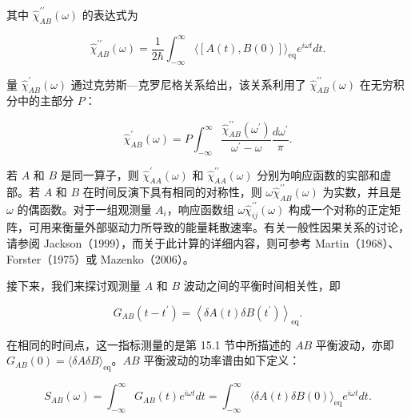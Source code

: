 其中 \(\hat{\chi}_{AB}^{\prime\prime}(\omega)\) 的表达式为

\begin{equation}\tag{15.6.12}\label{eq:15.6.12}
\hat { \chi } _ { A B } ^{\prime \prime} ( \omega ) = \frac { 1 } { 2 \hbar } \int _ { - \infty } ^{\infty} \langle [ A ( t ) , B ( 0 ) ] \rangle _ { \mathrm { e q } } e ^{i \omega t} d t .
\end{equation}

量 \(\hat{\chi}_{AB}^{\prime}(\omega)\) 通过克劳斯---克罗尼格关系给出，该关系利用了 \(\hat{\chi}_{AB}^{\prime\prime}(\omega)\) 在无穷积分中的主部分 \(P\)：

\begin{equation}\tag{15.6.13}\label{eq:15.6.13}
\hat { \chi } _ { A B } ^{'} ( \omega ) = P \int _ { - \infty } ^{\infty} \frac { \hat { \chi } _ { A B } ^{' \prime} ( \omega ^{\prime} ) } { \omega ^{\prime} - \omega } \frac { d \omega ^{\prime} } { \pi } .
\end{equation}

若 \(A\) 和 \(B\) 是同一算子，则 \(\hat{\chi}_{AA}^{\prime}(\omega)\) 和 \(\hat{\chi}_{AA}^{\prime\prime}(\omega)\) 分别为响应函数的实部和虚部。若 \(A\) 和 \(B\) 在时间反演下具有相同的对称性，则 \(\omega\hat{\chi}_{AB}^{\prime\prime}(\omega)\) 为实数，并且是 \(\omega\) 的偶函数。对于一组观测量 \(A_{i}\)，响应函数组 \(\omega\hat{\chi}_{ij}^{\prime\prime}(\omega)\) 构成一个对称的正定矩阵，可用来衡量外部驱动力所导致的能量耗散速率。有关一般性因果关系的讨论，请参阅 Jackson（1999），而关于此计算的详细内容，则可参考 Martin（1968）、Forster（1975）或 Mazenko（2006）。

接下来，我们来探讨观测量 \(A\) 和 \(B\) 波动之间的平衡时间相关性，即

\begin{equation}\tag{15.6.14}\label{eq:15.6.14}
G _ { A B } ( t - t ^{\prime} ) = \left\langle \delta A ( t ) \delta B ( t ^{\prime} ) \right\rangle _ { \mathrm { e q } } .
\end{equation}

在相同的时间点，这一指标测量的是第 15.1 节中所描述的 \(AB\) 平衡波动，亦即 \(G_{AB}(0)=\langle\delta A\delta B\rangle_{\mathrm{eq}}\)。\(AB\) 平衡波动的功率谱由如下定义：

\begin{equation}\tag{15.6.15}\label{eq:15.6.15}
S _ { A B } ( \omega ) = \int _ { - \infty } ^{\infty} G _ { A B } ( t ) e ^{i \omega t} d t = \int _ { - \infty } ^{\infty} \langle \delta A ( t ) \delta B ( 0 ) \rangle _ { \mathrm { e q } } e ^{i \omega t} d t .
\end{equation}


